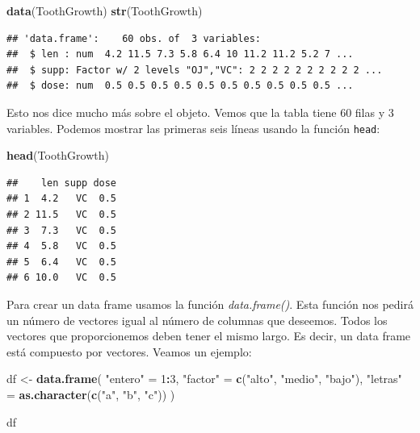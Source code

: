 \documentclass[
]{book}
\newenvironment{Shaded}{\begin{snugshade}}{\end{snugshade}}
\newcommand{\DecValTok}[1]{\textcolor[rgb]{0.00,0.00,0.81}{#1}}
\newcommand{\FunctionTok}[1]{\textcolor[rgb]{0.13,0.29,0.53}{\textbf{#1}}}
\newcommand{\NormalTok}[1]{#1}
\newcommand{\OtherTok}[1]{\textcolor[rgb]{0.56,0.35,0.01}{#1}}
\newcommand{\SpecialCharTok}[1]{\textcolor[rgb]{0.81,0.36,0.00}{\textbf{#1}}}
\newcommand{\StringTok}[1]{\textcolor[rgb]{0.31,0.60,0.02}{#1}}
\begin{document}
\begin{Shaded}
\begin{Highlighting}[]
\FunctionTok{data}\NormalTok{(ToothGrowth)}
\FunctionTok{str}\NormalTok{(ToothGrowth)}
\end{Highlighting}
\end{Shaded}

\begin{verbatim}
## 'data.frame':    60 obs. of  3 variables:
##  $ len : num  4.2 11.5 7.3 5.8 6.4 10 11.2 11.2 5.2 7 ...
##  $ supp: Factor w/ 2 levels "OJ","VC": 2 2 2 2 2 2 2 2 2 2 ...
##  $ dose: num  0.5 0.5 0.5 0.5 0.5 0.5 0.5 0.5 0.5 0.5 ...
\end{verbatim}

Esto nos dice mucho más sobre el objeto.
Vemos que la tabla tiene 60 filas y 3 variables.
Podemos mostrar las primeras seis líneas usando la función \texttt{head}:

\begin{Shaded}
\begin{Highlighting}[]
\FunctionTok{head}\NormalTok{(ToothGrowth)}
\end{Highlighting}
\end{Shaded}

\begin{verbatim}
##    len supp dose
## 1  4.2   VC  0.5
## 2 11.5   VC  0.5
## 3  7.3   VC  0.5
## 4  5.8   VC  0.5
## 5  6.4   VC  0.5
## 6 10.0   VC  0.5
\end{verbatim}

Para crear un data frame usamos la función \emph{data.frame()}.
Esta función nos pedirá un número de vectores igual al número de columnas que deseemos.
Todos los vectores que proporcionemos deben tener el mismo largo.
Es decir, un data frame está compuesto por vectores.
Veamos un ejemplo:

\begin{Shaded}
\begin{Highlighting}[]
\NormalTok{df }\OtherTok{\textless{}{-}} \FunctionTok{data.frame}\NormalTok{(}
  \StringTok{"entero"} \OtherTok{=} \DecValTok{1}\SpecialCharTok{:}\DecValTok{3}\NormalTok{, }
  \StringTok{"factor"} \OtherTok{=} \FunctionTok{c}\NormalTok{(}\StringTok{"alto"}\NormalTok{, }\StringTok{"medio"}\NormalTok{, }\StringTok{"bajo"}\NormalTok{), }
  \StringTok{"letras"} \OtherTok{=} \FunctionTok{as.character}\NormalTok{(}\FunctionTok{c}\NormalTok{(}\StringTok{"a"}\NormalTok{, }\StringTok{"b"}\NormalTok{, }\StringTok{"c"}\NormalTok{))}
\NormalTok{)}

\NormalTok{df}
\end{Highlighting}
\end{Shaded}
\end{document}
